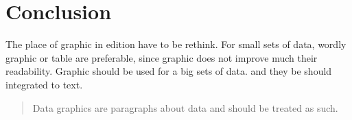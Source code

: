 \section{Conclusion}

The place of graphic in edition have to be rethink. For small sets of data, wordly graphic or table are preferable, since graphic does not improve much their readability. Graphic should be used for a big sets of data. and they be should integrated to text. 
\begin{quote}
Data graphics are paragraphs about data and should be treated as such.
\end{quote}
